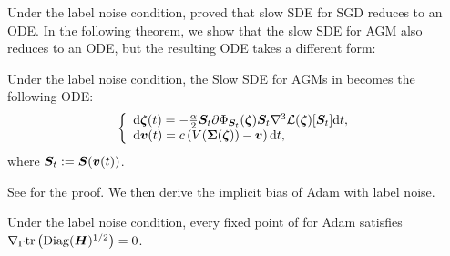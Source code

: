 Under the label noise condition, \citet{li2021happens} proved that slow SDE for SGD reduces to an ODE. In the following theorem, we show that the slow SDE for AGM also reduces to an ODE, but the resulting ODE takes a different form:


\begin{theorem}
Under the label noise condition, the Slow SDE for AGMs in  becomes the following ODE: 
    \begin{align}
        \left\{\begin{array}{l}
             \mathrm{d} {\bm{\zeta}}(t) =  - \frac{\alpha}{2} {\bm{S}}_t  \partial\Phi_{{\bm{S}}_t}({\bm{\zeta}}) {\bm{S}}_t \nabla^3 \mathcal{L}({\bm{\zeta}}) [{\bm{S}}_t]\mathrm{d} t, \\
             \mathrm{d} {\bm{v}}(t) = c \left(V({\bm{\Sigma}}({\bm{\zeta}})) - {\bm{v}}\right) \mathrm{d} t,
        \end{array}\right.
        \label{equ:AGMs-ODE}
    \end{align}
    where ${\bm{S}}_t:={\bm{S}}({\bm{v}}(t))$.
    \label{thm:agm-slow-ode}
\end{theorem}

See  for the proof. We then derive the implicit bias of Adam with label noise.

\begin{lemma}
        Under the label noise condition, every fixed point of  for Adam satisfies $\nabla_{\Gamma} \text{tr}\left(\mathrm{Diag}({\bm{H}})^{1/2}\right) = 0$.
    \label{thm:adam-implicit-bias-label-noise}
\end{lemma}
    

